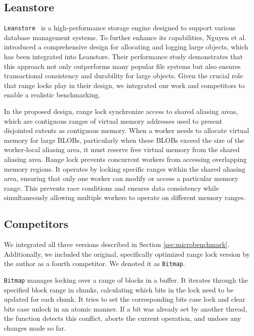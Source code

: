 \subsection{Leanstore}

\texttt{Leanstore}~\parencite{leis2018leanstore} is a high-performance storage engine designed to support various database management systems. 
To further enhance its capabilities, Nguyen et al.~\parencite{nguyen2024files} introduced a comprehensive design for allocating and logging large objects, which has been integrated into Leanstore. 
Their performance study demonstrates that this approach not only outperforms many popular file systems but also ensures transactional consistency and durability for large objects. Given the crucial role that range locks play in their design, we integrated our work and competitors to enable a realistic benchmarking.

In the proposed design, range lock synchronize access to shared aliasing areas, which are contiguous ranges of virtual memory addresses used to present disjointed extents as contiguous memory. 
When a worker needs to allocate virtual memory for large BLOBs, particularly when these BLOBs exceed the size of the worker-local aliasing area, it must reserve free virtual memory from the shared aliasing area. 
Range lock prevents concurrent workers from accessing overlapping memory regions. 
It operates by locking specific ranges within the shared aliasing area, ensuring that only one worker can modify or access a particular memory range. 
This prevents race conditions and ensures data consistency while simultaneously allowing multiple workers to operate on different memory ranges. 

\subsection{Competitors}

We integrated all three versions described in Section \ref{sec:microbenchmark}. 
Additionally, we included the original, specifically optimized range lock version by the author as a fourth competitor. 
We denoted it as \texttt{Bitmap}.

\texttt{Bitmap} manages locking over a range of blocks in a buffer. It iterates through the specified block range in chunks, calculating which bits in the lock need to be updated for each chunk. It tries to set the corresponding bits case lock and clear bits case unlock in an atomic manner. If a bit was already set by another thread, the function detects this conflict, aborts the current operation, and undoes any changes made so far. 

